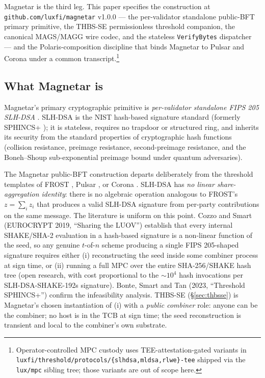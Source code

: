Magnetar is the third leg. This paper specifies the construction at
\texttt{github.com/luxfi/magnetar} v1.0.0 --- the per-validator
standalone public-BFT primary primitive, the THBS-SE permissionless
threshold companion, the canonical MAGS/MAGG wire codec, and the
stateless \texttt{VerifyBytes} dispatcher --- and the
Polaris-composition discipline that binds Magnetar to Pulsar and
Corona under a common transcript.\footnote{Operator-controlled MPC
custody uses TEE-attestation-gated variants in
\texttt{luxfi/threshold/protocols/\{slhdsa,mldsa,rlwe\}-tee} shipped
via the \texttt{lux/mpc} sibling tree; those variants are out of
scope here.}

\subsection{What Magnetar is}
\label{sec:intro:what}

Magnetar's primary cryptographic primitive is \emph{per-validator
standalone FIPS 205 SLH-DSA} \cite{fips205}. SLH-DSA is the NIST
hash-based signature standard (formerly SPHINCS+ \cite{sphincs}); it
is stateless, requires no trapdoor or structured ring, and inherits
its security from the standard properties of cryptographic hash
functions (collision resistance, preimage resistance,
second-preimage resistance, and the Boneh--Shoup
\cite{boneh-shoup-textbook} sub-exponential preimage bound under
quantum adversaries).

The Magnetar public-BFT construction departs deliberately from the
threshold templates of FROST \cite{frost,rfc9591}, Pulsar
\cite{lp073pulsarpaper}, or Corona \cite{lp104corona}. SLH-DSA has
\emph{no linear share-aggregation identity}: there is no algebraic
operation analogous to FROST's $z = \sum_i z_i$ that produces a valid
SLH-DSA signature from per-party contributions on the same message.
The literature is uniform on this point. Cozzo and Smart
\cite{cosmin2021} (EUROCRYPT 2019, ``Sharing the LUOV'') establish
that every internal SHAKE/SHA-2 evaluation in a hash-based signature
is a non-linear function of the seed, so any genuine $t$-of-$n$
scheme producing a single FIPS 205-shaped signature requires either
(i) reconstructing the seed inside some combiner process at sign
time, or (ii) running a full MPC over the entire SHA-256/SHAKE hash
tree (open research, with cost proportional to the $\sim 10^4$ hash
invocations per SLH-DSA-SHAKE-192s signature). Bonte, Smart and Tan
(2023, ``Threshold SPHINCS+'') confirm the infeasibility analysis.
THBS-SE (\S\ref{sec:thbsse}) is Magnetar's chosen instantiation of
(i) with a \emph{public combiner} role: anyone can be the combiner;
no host is in the TCB at sign time; the seed reconstruction is
transient and local to the combiner's own substrate.

